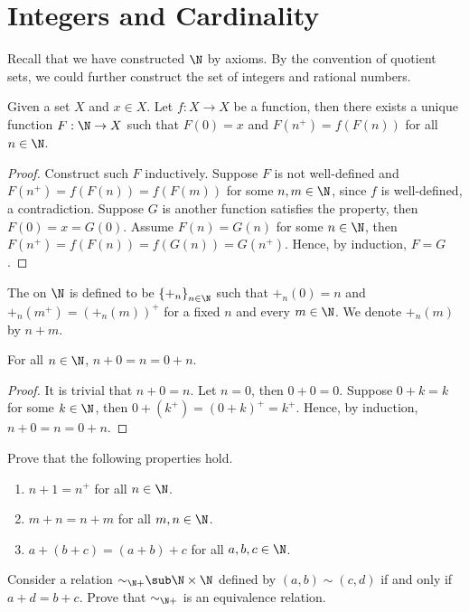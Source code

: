 \documentclass[10pt]{article}
\begin{document}
\section{Integers and Cardinality}
Recall that we have constructed $\N$ by axioms. By the convention of quotient sets, we could further construct the set of integers and rational numbers.
\begin{theorem}[recursion]
    Given a set $X$ and $x\in X$. Let $f:X\to X$ be a function, then there exists a unique function $F:\N\to X$ such that $F(0)=x$ and $F({n}^{+})=f(F(n))$ for all $n\in\N$.
\end{theorem}
\begin{proof}
    Construct such $F$ inductively. Suppose $F$ is not well-defined and $F({n}^{+})=f(F(n))=f(F(m))$ for some $n,m\in\N$, since $f$ is well-defined, a contradiction. Suppose $G$ is another function satisfies the property, then $F(0)=x=G(0)$. Assume $F(n)=G(n)$ for some $n\in\N$, then $F({n}^{+})=f(F(n))=f(G(n))=G({n}^{+})$. Hence, by induction, $F=G$.
\end{proof}
\begin{definition}
    The  on $\N$ is defined to be ${\{{+}_{n}\}}_{n\in\N}$ such that ${+}_{n}(0)=n$ and ${+}_{n}({m}^{+})={({+}_{n}(m))}^{+}$ for a fixed $n$ and every $m\in\N$. We denote ${+}_{n}(m)$ by $n+m$.
\end{definition}
\begin{proposition}
    For all $n\in\N$, $n+0=n=0+n$.
\end{proposition}
\begin{proof}
    It is trivial that $n+0=n$. Let $n=0$, then $0+0=0$. Suppose $0+k=k$ for some $k\in\N$, then $0+({k}^{+})={(0+k)}^{+}={k}^{+}$. Hence, by induction, $n+0=n=0+n$.
\end{proof}
\begin{problem}
    Prove that the following properties hold.
    \begin{enumerate}
        \item $n+1={n}^{+}$ for all $n\in\N$.
        \item $m+n=n+m$ for all $m,n\in\N$.
        \item $a+(b+c)=(a+b)+c$ for all $a,b,c\in\N$.
    \end{enumerate}
\end{problem}
\begin{problem}
    Consider a relation ${\sim}_{\N+}\sub\N\times\N$ defined by $(a,b)\sim(c,d)$ if and only if $a+d=b+c$. Prove that ${\sim}_{\N+}$ is an equivalence relation.
\end{problem}
\end{document}
